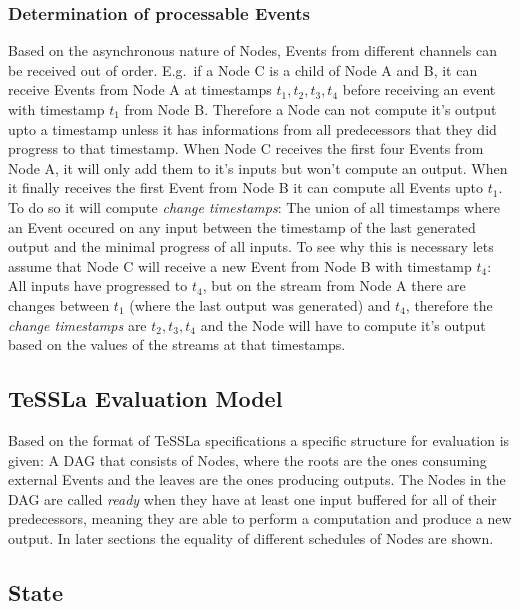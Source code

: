 \subsubsection{Determination of processable Events}
\label{sec:concepts:defs:nodes:processable}

Based on the asynchronous nature of Nodes, Events from different channels can be received out of order.
E.g.\ if a Node C is a child of Node A and B, it can receive Events from Node A at timestamps \(t_1, t_2, t_3, t_4\)
before receiving an event with timestamp \(t_1\) from Node B.
Therefore a Node can not compute it's output upto a timestamp unless it has informations from all predecessors that they did progress to that timestamp.
When Node C receives the first four Events from Node A, it will only add them to it's inputs but won't compute an output.
When it finally receives the first Event from Node B it can compute all Events upto \(t_1\).
To do so it will compute \emph{change timestamps}: The union of all timestamps where an Event occured on any input between the timestamp of the last generated output and the minimal progress of all inputs.
To see why this is necessary lets assume that Node C will receive a new Event from Node B with timestamp \(t_4\):
All inputs have progressed to \(t_4\), but on the stream from Node A there are changes between \(t_1\) (where the last output was generated) and \(t_4\),
therefore the \emph{change timestamps} are \(t_2, t_3, t_4\) and the Node will have to compute it's output based on the values of the streams at that timestamps.

\subsection{TeSSLa Evaluation Model}
\label{sec:concepts:def:model}

Based on the format of TeSSLa specifications a specific structure for evaluation is given:
A DAG that consists of Nodes, where the roots are the ones consuming external Events and the leaves are the ones producing outputs.
The Nodes in the DAG are called \emph{ready} when they have at least one input buffered for all of their predecessors, meaning they are able to perform a computation and produce a new output.
In later sections the equality of different schedules of Nodes are shown.

\subsection{State}
\label{sec:concepts:def:state}


